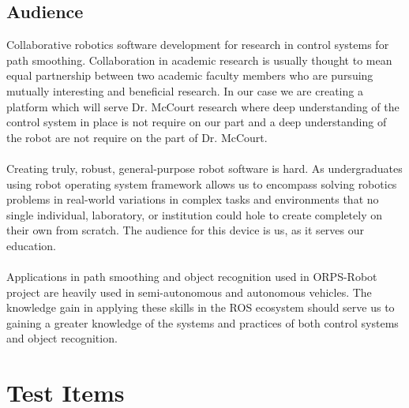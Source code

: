 \documentclass[english,12pt]{article}
\begin{document}
\subsection{Audience}
Collaborative robotics software development for research in control systems 
for path smoothing. Collaboration in academic research is usually thought to mean 
equal partnership between two academic faculty members who are pursuing mutually 
interesting and beneficial research. In our case we are creating a platform which 
will serve Dr. McCourt research where deep understanding of the control system in 
place is not require on our part and a deep understanding of the robot are not 
require on the part of Dr. McCourt.\\\\
Creating truly, robust, general-purpose robot software is hard. As 
undergraduates using robot operating system framework allows us to encompass 
solving robotics problems in real-world variations in complex tasks and 
environments that no single individual, laboratory, or institution could 
hole to create completely on their own from scratch. The audience for this 
device is us, as it serves our education.\\\\
Applications in path smoothing and object recognition used in 
ORPS-Robot project are heavily used in semi-autonomous and autonomous 
vehicles. The knowledge gain in applying these skills in the ROS ecosystem 
should serve us to gaining a greater knowledge of the systems and 
practices of both control systems and object recognition.
\section{Test Items}
\end{document}
